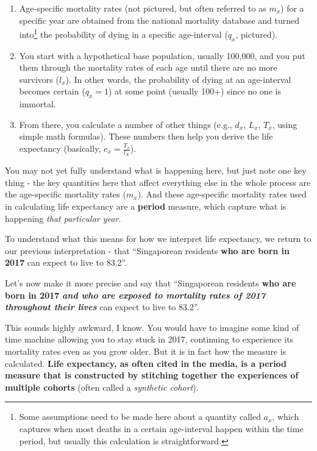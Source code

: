 \documentclass[
  openany]{book}
\begin{document}
\begin{enumerate}
\def\labelenumi{\arabic{enumi}.}
\item
  Age-specific mortality rates (not pictured, but often referred to as \(m_x\)) for a specific year are obtained from the national mortality database and turned into\footnote{Some assumptions need to be made here about a quantity called \(a_x\), which captures when most deaths in a certain age-interval happen within the time period, but usually this calculation is straightforward.} the probability of dying in a specific age-interval (\(q_x\), pictured).
\item
  You start with a hypothetical base population, usually 100,000, and you put them through the mortality rates of each age until there are no more survivors (\(l_x\)). In other words, the probability of dying at an age-interval becomes certain (\(q_x = 1\)) at some point (usually 100+) since no one is immortal.
\item
  From there, you calculate a number of other things (e.g., \(d_x\), \(L_x\), \(T_x\), using simple math formulas). These numbers then help you derive the life expectancy (basically, \(e_x = \frac{T_x}{l_X}\)).
\end{enumerate}

You may not yet fully understand what is happening here, but just note one key thing - the key quantities here that affect everything else in the whole process are the age-specific mortality rates (\(m_x\)). And these age-specific mortality rates used in calculating life expectancy are a \textbf{period} measure, which capture what is happening \emph{that particular year}.

To understand what this means for how we interpret life expectancy, we return to our previous interpretation - that ``Singaporean residents \textbf{who are born in 2017} can expect to live to 83.2''.

Let's now make it more precise and say that ``Singaporean residents \textbf{who are born in 2017} \emph{\textbf{and who are exposed to mortality rates of 2017 throughout their lives}} can expect to live to 83.2''.

This sounds highly awkward, I know. You would have to imagine some kind of time machine allowing you to stay stuck in 2017, continuing to experience its mortality rates even as you grow older. But it is in fact how the measure is calculated. \textbf{Life expectancy, as often cited in the media, is a period measure that is constructed by stitching together the experiences of multiple cohorts} (often called a \emph{synthetic cohort}).
\end{document}
